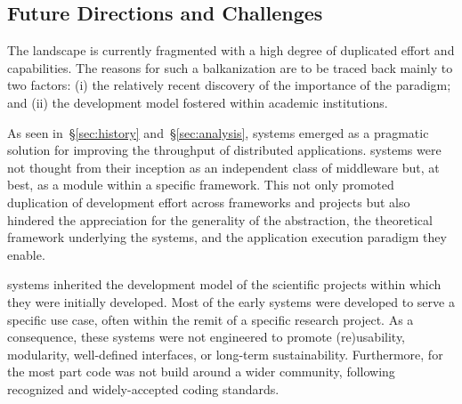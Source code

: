 \documentclass{sig-alternate}
\begin{document}
%
\subsection{Future Directions and Challenges}
\label{sec:future}

The \pilot landscape is currently fragmented with a high degree of duplicated
effort and capabilities. The reasons for such a balkanization are to be traced
back mainly to two factors: (i) the relatively recent discovery of the
importance of the \pilot paradigm; and (ii) the development model fostered
within academic institutions.

As seen in~\S\ref{sec:history} and~\S\ref{sec:analysis}, \pilot systems emerged
as a pragmatic solution for improving the throughput of distributed
applications. \pilot systems were not thought from their inception as an
independent class of middleware but, at best, as a module within a specific
framework. This not only promoted duplication of development effort across
frameworks and projects but also hindered the appreciation for the generality of
the \pilot abstraction, the theoretical framework underlying the \pilot systems,
and the application execution paradigm they enable.

\pilot systems inherited the development model of the scientific projects
within which they were initially developed. Most of the early \pilot systems
were developed to serve a specific use case, often within the remit of a
specific research project. As a consequence, these systems were not engineered
to promote (re)usability, modularity, well-defined interfaces, or long-term
sustainability. Furthermore, for the most part code was not build around a
wider community, following recognized and widely-accepted coding standards.

\end{document}
